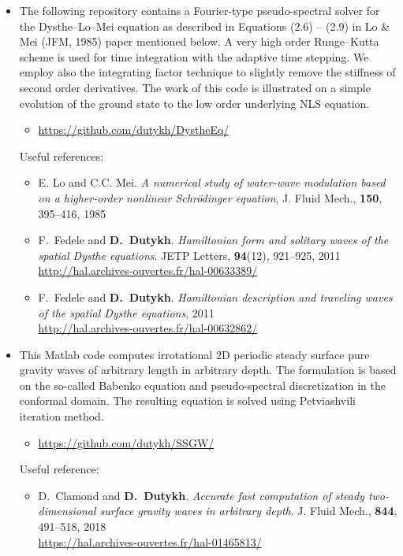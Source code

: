 \documentclass[final, a4paper, oneside, 12pt]{article}
\numberwithin{equation}{section}
\begin{document}
\begin{itemize}

  \item The following repository contains a Fourier-type pseudo-spectral solver for the Dysthe--Lo--Mei equation as described in Equations (2.6) -- (2.9) in Lo \& Mei (JFM, 1985) paper mentioned below. A very high order Runge--Kutta scheme is used for time integration with the adaptive time stepping. We employ also the integrating factor technique to slightly remove the stiffness of second order derivatives. The work of this code is illustrated on a simple evolution of the ground state to the low order underlying NLS equation.
  
  \begin{itemize}
    \item \url{https://github.com/dutykh/DystheEq/}
  \end{itemize}
  
  Useful references:
  \begin{itemize}
    \item E. Lo and C.C. Mei. \textit{A numerical study of water-wave modulation based on a higher-order nonlinear Schr\"odinger equation}, J. Fluid Mech., \textbf{150}, 395--416, 1985
    \item F.~Fedele and \textbf{D.~Dutykh}. \textit{Hamiltonian form and solitary waves of the spatial Dysthe equations}. JETP Letters, \textbf{94}(12), 921--925, 2011 \\
    \url{http://hal.archives-ouvertes.fr/hal-00633389/}
    \item F.~Fedele and \textbf{D.~Dutykh}. \textit{Hamiltonian description and traveling waves of the spatial Dysthe equations}, 2011 \\
  \url{http://hal.archives-ouvertes.fr/hal-00632862/}
  \end{itemize}

\end{itemize}

\begin{itemize}
  
  \item This Matlab code computes irrotational 2D periodic steady surface pure gravity waves of arbitrary length in arbitrary depth. The formulation is based on the so-called Babenko equation and pseudo-spectral discretization in the conformal domain. The resulting equation is solved using Petviashvili iteration method.
  
  \begin{itemize}
    \item \url{https://github.com/dutykh/SSGW/}
  \end{itemize}
  
  Useful reference:
  \begin{itemize}
    \item D.~Clamond and \textbf{D.~Dutykh}. \textit{Accurate fast computation of steady two-dimensional surface gravity waves in arbitrary depth}. J. Fluid Mech., \textbf{844}, 491--518, 2018 \\
  \url{https://hal.archives-ouvertes.fr/hal-01465813/}
  \end{itemize}
  
\end{itemize}
\end{document}
